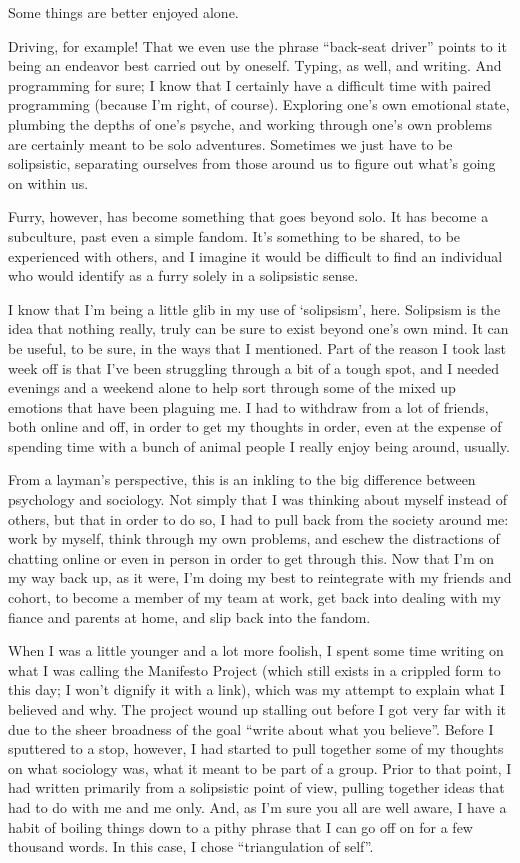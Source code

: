 
Some things are better enjoyed alone.

Driving, for example!  That we even use the phrase ``back-seat driver'' points to it being an endeavor best carried out by oneself.  Typing, as well, and writing.  And programming for sure; I know that I certainly have a difficult time with paired programming (because I'm right, of course).  Exploring one's own emotional state, plumbing the depths of one's psyche, and working through one's own problems are certainly meant to be solo adventures.  Sometimes we just have to be solipsistic, separating ourselves from those around us to figure out what's going on within us.

Furry, however, has become something that goes beyond solo.  It has become a subculture, past even a simple fandom.  It's something to be shared, to be experienced with others, and I imagine it would be difficult to find an individual who would identify as a furry solely in a solipsistic sense.

I know that I'm being a little glib in my use of `solipsism', here.  Solipsism is the idea that nothing really, truly can be sure to exist beyond one's own mind.  It can be useful, to be sure, in the ways that I mentioned.  Part of the reason I took last week off is that I've been struggling through a bit of a tough spot, and I needed evenings and a weekend alone to help sort through some of the mixed up emotions that have been plaguing me.  I had to withdraw from a lot of friends, both online and off, in order to get my thoughts in order, even at the expense of spending time with a bunch of animal people I really enjoy being around, usually.

From a layman's perspective, this is an inkling to the big difference between psychology and sociology.  Not simply that I was thinking about myself instead of others, but that in order to do so, I had to pull back from the society around me: work by myself, think through my own problems, and eschew the distractions of chatting online or even in person in order to get through this.  Now that I'm on my way back up, as it were, I'm doing my best to reintegrate with my friends and cohort, to become a member of my team at work, get back into dealing with my fiance and parents at home, and slip back into the fandom.

When I was a little younger and a lot more foolish, I spent some time writing on what I was calling the Manifesto Project (which still exists in a crippled form to this day; I won't dignify it with a link), which was my attempt to explain what I believed and why.  The project wound up stalling out before I got very far with it due to the sheer broadness of the goal ``write about what you believe''.  Before I sputtered to a stop, however, I had started to pull together some of my thoughts on what sociology was, what it meant to be part of a group.  Prior to that point, I had written primarily from a solipsistic point of view, pulling together ideas that had to do with me and me only.  And, as I'm sure you all are well aware, I have a habit of boiling things down to a pithy phrase that I can go off on for a few thousand words.  In this case, I chose ``triangulation of self''.

